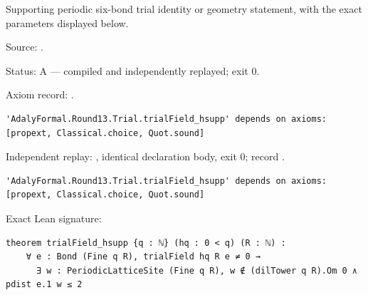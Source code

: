 \begin{theorem}[bp-370]
\label{bp-370}
\leanok
Supporting periodic six-bond trial identity or geometry statement, with the exact parameters displayed below.

\par Source: \texttt{}.
\par Status: A — compiled and independently replayed; exit 0.
\par Axiom record: \texttt{}.
\begin{verbatim}
'AdalyFormal.Round13.Trial.trialField_hsupp' depends on axioms: [propext, Classical.choice, Quot.sound]
\end{verbatim}
\par Independent replay: \texttt{}, identical declaration body, exit 0; record \texttt{}.
\begin{verbatim}
'AdalyFormal.Round13.Trial.trialField_hsupp' depends on axioms: [propext, Classical.choice, Quot.sound]
\end{verbatim}
\par Exact Lean signature:
\begin{verbatim}
theorem trialField_hsupp {q : ℕ} (hq : 0 < q) (R : ℕ) :
    ∀ e : Bond (Fine q R), trialField hq R e ≠ 0 →
      ∃ w : PeriodicLatticeSite (Fine q R), w ∉ (dilTower q R).Om 0 ∧ pdist e.1 w ≤ 2
\end{verbatim}
\end{theorem}

